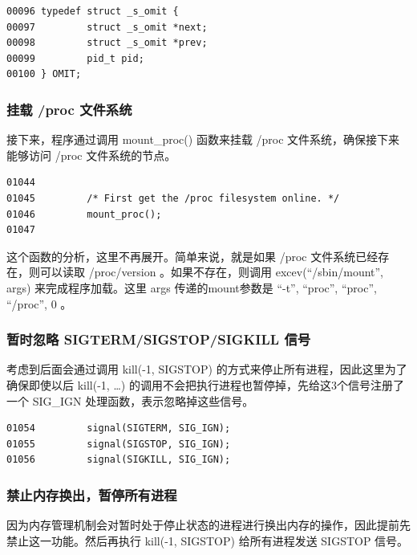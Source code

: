 {\begin{shaded}\begin{verbatim}
00096 typedef struct _s_omit {
00097         struct _s_omit *next;
00098         struct _s_omit *prev;
00099         pid_t pid;
00100 } OMIT;
\end{verbatim}\end{shaded}}
\subsubsection{挂载 /proc 文件系统}

接下来，程序通过调用 mount\_proc() 函数来挂载 /proc
文件系统，确保接下来能够访问 /proc 文件系统的节点。

{\begin{shaded}\begin{verbatim}
01044 
01045         /* First get the /proc filesystem online. */
01046         mount_proc();
01047 
\end{verbatim}\end{shaded}}
这个函数的分析，这里不再展开。简单来说，就是如果 /proc
文件系统已经存在，则可以读取 /proc/version 。如果不存在，则调用
excev(``/sbin/mount'', args) 来完成程序加载。这里 args 传递的mount参数是
``-t'', ``proc'', ``proc'', ``/proc'', 0 。

\subsubsection{暂时忽略 SIGTERM/SIGSTOP/SIGKILL 信号}

考虑到后面会通过调用 kill(-1, SIGSTOP)
的方式来停止所有进程，因此这里为了确保即使以后 kill(-1, \ldots{})
的调用不会把执行进程也暂停掉，先给这3个信号注册了一个 SIG\_IGN
处理函数，表示忽略掉这些信号。

{\begin{shaded}\begin{verbatim}
01054         signal(SIGTERM, SIG_IGN);
01055         signal(SIGSTOP, SIG_IGN);
01056         signal(SIGKILL, SIG_IGN);
\end{verbatim}\end{shaded}}
\subsubsection{禁止内存换出，暂停所有进程}

因为内存管理机制会对暂时处于停止状态的进程进行换出内存的操作，因此提前先禁止这一功能。然后再执行
kill(-1, SIGSTOP) 给所有进程发送 SIGSTOP 信号。

